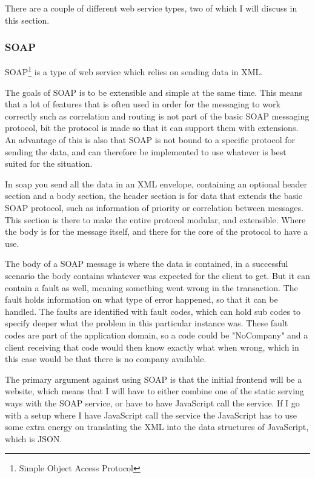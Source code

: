 There are a couple of different web service types, two of which I will discuss in this section.

\subsubsection{SOAP}
\label{subs:SOAP}
SOAP\footnote{Simple Object Access Protocol} is a type of web service which relies on sending data in XML.

The goals of SOAP is to be extensible and simple at the same time\cite{soap:messaging}. This means that a lot of features that is often used in order for the messaging to work correctly such as correlation and routing is not part of the basic SOAP messaging protocol, bit the protocol is made so that it can support them with extensions. An advantage of this is also that SOAP is not bound to a specific protocol for sending the data, and can therefore be implemented to use whatever is best suited for the situation.

In soap you send all the data in an XML envelope, containing an optional header section and a body section, the header section is for data that extends the basic SOAP protocol, such as information of priority or correlation between messages\cite{soap:messaging}. This section is there to make the entire protocol modular, and extensible. Where the body is for the message itself, and there for the core of the protocol to have a use.

The body of a SOAP message is where the data is contained, in a successful scenario the body contains whatever was expected for the client to get. But it can contain a fault as well, meaning something went wrong in the transaction. The fault holds information on what type of error happened, so that it can be handled. The faults are identified with fault codes, which can hold sub codes to specify deeper what the problem in this particular instance was. These fault codes are part of the application domain, so a code could be "NoCompany" and a client receiving that code would then know exactly what when wrong, which in this case would be that there is no company available.

The primary argument against using SOAP is that the initial frontend will be a website, which means that I will have to either combine one of the static serving ways with the SOAP service, or have to have JavaScript call the service. If I go with a setup where I have JavaScript call the service the JavaScript has to use some extra energy on translating the XML into the data structures of JavaScript, which is JSON.

